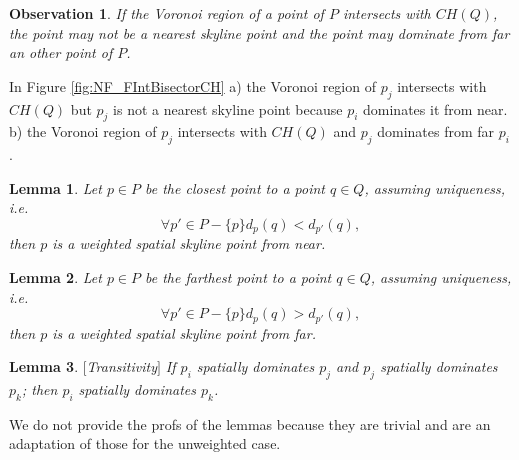 \documentclass[11pt,onecolumn]{elsart3p}
\newtheorem{lemma}{Lemma}
\newtheorem{observation}{Observation}
\newenvironment{proof}{\vspace{1ex}\noindent{\bf Proof}\hspace{0.5em}}
    {\hfill\qed\vspace{1ex}}
\begin{document}
        \begin{observation}If the Voronoi region of a point of $P$ intersects with $CH(Q)$, the point may not be a nearest skyline point and the point may dominate from far an other point of $P$.
        \label{obs:w_notVD}
        \end{observation}

        In Figure \ref{fig:NF_FIntBisectorCH} a) the Voronoi region of $p_j$ intersects with $CH(Q)$ but $p_j$ is not a nearest skyline point because $p_i$ dominates it from near. b) the Voronoi region of $p_j$ intersects with $CH(Q)$ and $p_j$ dominates from far $p_i$.




        \vspace{1em}
        \begin{lemma} Let $p\in P$ be the closest point to a point $q \in Q$, assuming uniqueness, i.e. $$\forall p' \in P-\{p\} d_p(q)<d_{p'}(q),$$ then $p$ is a weighted spatial skyline point from near.\label{lemma:w_closestWSS} \end{lemma}
         \vspace{1em}

         \vspace{1em} \begin{lemma} Let $p\in P$ be the farthest point to a point $q \in Q$, assuming uniqueness, i.e. $$\forall p' \in P-\{p\} d_p(q)>d_{p'}(q),$$ then $p$ is a weighted spatial skyline point from far. \label{lemma:w_farthestWSS} \end{lemma}
         \vspace{1em}

         \begin{lemma} {\it $[$Transitivity$]$} If $p_i$ spatially dominates $p_j$ and $p_j$ spatially dominates $p_k$; then $p_i$ spatially dominates $p_k$. \vspace{0.6em} \label{lemma:w_transitivity}\end{lemma}

         We do not provide the profs of the lemmas because they are trivial and are an adaptation of those for the unweighted case.
\end{document}
